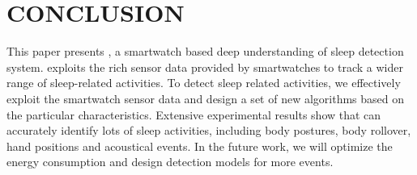 
\section{CONCLUSION}
This paper presents \systemname, a smartwatch based deep understanding of sleep detection system. \systemname exploits the rich sensor data
provided by smartwatches to track a wider range of sleep-related activities. To detect sleep related activities, we effectively exploit the
smartwatch sensor data and design a set of new algorithms based on the particular characteristics. Extensive experimental results show that
\systemname can accurately identify lots of sleep activities, including body postures, body rollover, hand positions and acoustical events.
In the future work, we will optimize the energy consumption and design detection models for more events.
